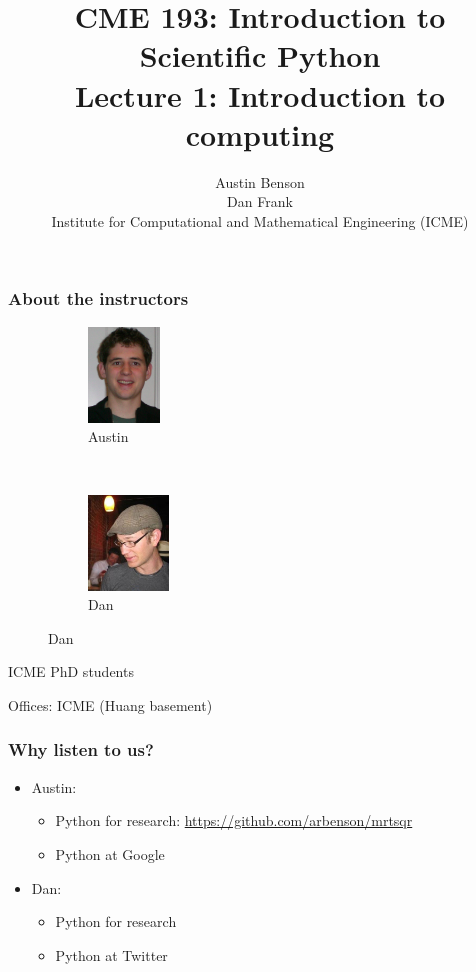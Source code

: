 \documentclass{beamer}
\title{CME 193: Introduction to Scientific Python \\
Lecture 1: Introduction to computing}
\author{Austin Benson \\
\vspace{0.1in}
Dan Frank \\
\vspace{0.1in}
Institute for Computational and Mathematical Engineering (ICME)}
\begin{document}
\maketitle

\begin{frame}
\frametitle{About the instructors}

\begin{figure}
        \centering
	\begin{subfigure}[b]{0.45\textwidth}
	\centering
	\includegraphics[height=1in]{"images/austin"}
	\caption{Austin}
	\label{fig:hw2_15a}
	\end{subfigure}
        ~ %
	\begin{subfigure}[b]{0.45\textwidth}
	\centering
	\includegraphics[height=1in]{"images/dan"}
	\caption{Dan}
	\label{fig:hw2_15b}
	\end{subfigure}
\end{figure}

ICME PhD students

Offices: ICME (Huang basement)
\end{frame}

\begin{frame}
\frametitle{Why listen to us?}

\begin{itemize}
\setlength{\itemsep}{0.2in}
\item{Austin:
\begin{itemize}
\setlength{\itemsep}{0.05in}
\item{Python for research: \url{https://github.com/arbenson/mrtsqr}}
\item{Python at Google}
\end{itemize}
}
\item{Dan:
\begin{itemize}
\setlength{\itemsep}{0.05in}
\item{Python for research}
\item{Python at Twitter}
\end{itemize}
}
\end{itemize}

\end{frame}
\end{document}
